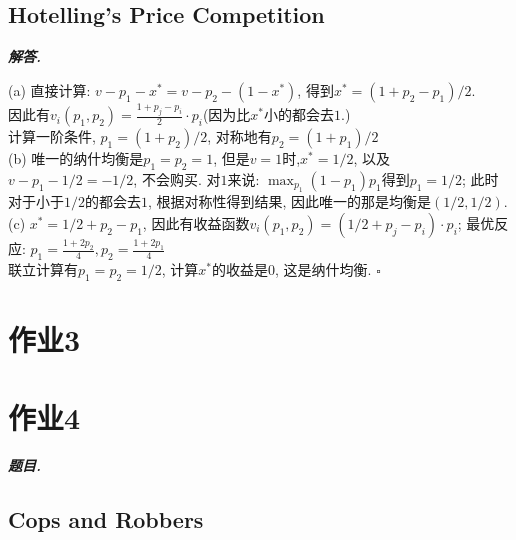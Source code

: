 \documentclass[10pt, a4paper, oneside]{ctexart}
\newenvironment{problem}{\begin{framed}\par\noindent\textbf{\textit{题目. }}}{\end{framed}\par}
\newenvironment{solution}{%
  \par\noindent\textbf{\textit{解答. }}\ignorespaces
}{%
  \hfill\ensuremath{\square}\par %
}
\begin{document}
\subsection{Hotelling's Price Competition}
\begin{solution}
(a) 直接计算: $v-p_1-x^*=v-p_2-(1-x^*)$, 得到$x^*=(1+p_2-p_1)/2$.\\
因此有$v_i(p_1,p_2)=\frac{1+p_j-p_i}{2}\cdot p_i$(因为比$x^*$小的都会去$1$.)\\
计算一阶条件, $p_1=(1+p_2)/2$, 对称地有$p_2=(1+p_1)/2$\\
(b) 唯一的纳什均衡是$p_1=p_2=1$, 但是$v=1$时,$x^*=1/2$, 以及$v-p_1-1/2=-1/2$, 不会购买. 对$1$来说: $\max_{p_1}(1-p_1)p_1$得到$p_1=1/2$; 此时对于小于$1/2$的都会去$1$, 根据对称性得到结果, 因此唯一的那是均衡是$(1/2,1/2)$.\\
(c) $x^*=1/2+p_2-p_1$, 因此有收益函数$v_i(p_1,p_2)=(1/2+p_j-p_i)\cdot p_i$; 最优反应: $p_1=\frac{1+2p_2}{4}, p_2=\frac{1+2p_1}{4}$\\
联立计算有$p_1=p_2=1/2$, 计算$x^*$的收益是$0$, 这是纳什均衡.
\end{solution}

\section{作业3}

\section{作业4}
\begin{problem}

\end{problem}

\subsection{Cops and Robbers}
\end{document}

